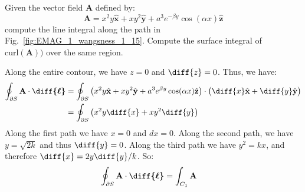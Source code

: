             \begin{problem}[Wangsness 1-15]
                \label{problem:EMAG_1_wangsness_1_15}
                Given the vector field $\mathbf{A}$ defined by:
                \begin{equation}
                    \mathbf{A}=x^{2}y\hat{\mathbf{x}}
                              +xy^{2}\hat{\mathbf{y}}
                        +a^{3}e^{-\beta{y}}\cos(\alpha{x})
                            \hat{\mathbf{z}}
                \end{equation}
                compute the line integral along the path in
                Fig.~\ref{fig:EMAG_1_wangsness_1_15}.
                Compute the surface integral of
                $\mathrm{curl}(\mathbf{A}))$ over the same region.
            \end{problem}
            \begin{solution}
                Along the entire contour, we have $z=0$ and
                $\diff{z}=0$. Thus, we have:
                \begin{subequations}
                    \begin{align}
                        \oint_{\partial S}
                            \mathbf{A}\cdot\boldsymbol{\diff{\ell}}
                        &=\oint_{\partial S}\big(
                             x^{2}y\hat{\mathbf{x}}
                            +xy^{2}\hat{\mathbf{y}}
                            +a^{3}e^{\beta{y}}\cos(\alpha{x})
                                \hat{\mathbf{z}}
                        \big)\cdot\big(
                             \diff{x}\hat{\mathbf{x}}
                            +\diff{y}\hat{\mathbf{y}}
                        \big)\\
                        &=\oint_{\partial S}
                        \big(x^{2}y\diff{x}+xy^{2}\diff{y}\big)
                    \end{align}
                \end{subequations}
                Along the first path we have $x=0$ and $dx=0$.
                Along the second path, we
                have $y=\sqrt{2k}$ and thus $\diff{y}=0$.
                Along the third path we have $y^{2}=kx$,
                and therefore $\diff{x}=2y\diff{y}/k$. So:
                \begin{subequations}
                    \begin{align}
                        \oint_{\partial{S}}
                            \mathbf{A}\cdot\boldsymbol{\diff{\ell}}
                        &=\int_{C_{1}}\mathbf{A}

\end{align}
\end{subequations}
\end{solution}
